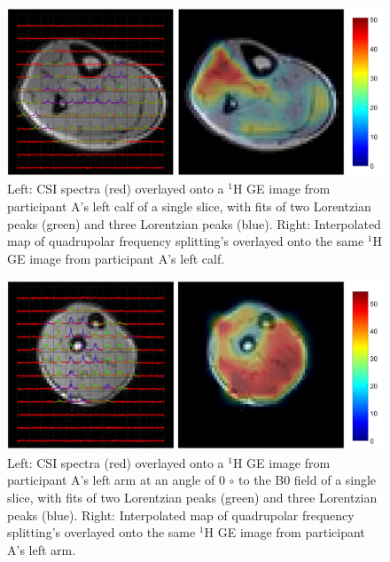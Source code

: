 \documentclass[class=article, crop=false]{standalone}
\begin{document}
\begin{figure}
    \centering
    \includegraphics[width=1\textwidth]{Figures/Quad/Calf_A.png}
    \caption{Left: CSI spectra (red) overlayed onto a $^1$H GE image from participant A's left calf of a single slice, with fits of two Lorentzian peaks (green) and three Lorentzian peaks (blue). Right: Interpolated map of quadrupolar frequency splitting's overlayed onto the same $^1$H GE image from participant A's left calf. }
    \label{fig:D2O:Calf_A}
\end{figure}

\begin{figure}
    \centering
    \includegraphics[width=1\textwidth]{Figures/Quad/Arm_A.png}
    \caption{Left: CSI spectra (red) overlayed onto a $^1$H GE image from participant A's left arm at an angle of 0 ${\circ}$ to the B0 field of a single slice, with fits of two Lorentzian peaks (green) and three Lorentzian peaks (blue). Right: Interpolated map of quadrupolar frequency splitting's overlayed onto the same $^1$H GE image from participant A's left arm. }
    \label{fig:D2O:Arm_A}
\end{figure}
\end{document}
